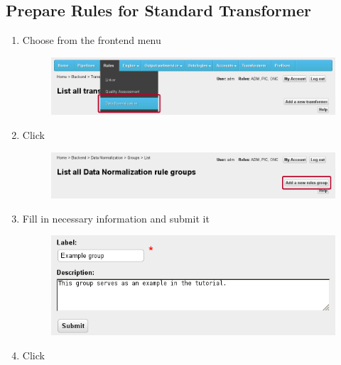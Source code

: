 \subsection*{Prepare Rules for Standard Transformer}
\begin{enumerate}[resume]
	\item Choose  from the frontend menu

\begin{figure}[!h]
    \centering
    \includegraphics[width=\textwidth]{images/fe-walkthrough-menu-rules.png}
	\label{fig:feWTMenuRules}
\end{figure}

	\item Click 

\begin{figure}[!h]
    \centering
    \includegraphics[width=\textwidth]{images/fe-walkthrough-add-group.png}
	\label{fig:feWTAddGroup}
\end{figure}

	\item Fill in necessary information and submit it

\begin{figure}[!h]
    \centering
    \includegraphics[width=\textwidth]{images/fe-walkthrough-new-group.png}
	\label{fig:feWTNewGroup}
\end{figure}

	\item Click 


\end{enumerate}
